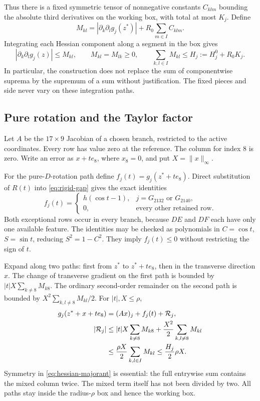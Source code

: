 \documentclass[11pt]{article}
\begin{document}
Thus there is a fixed symmetric tensor of nonnegative constants $C_{klm}$ bounding the absolute third derivatives on the working box, with total at most $K_j$. Define
\[
 M_{kl}=|\partial_k\partial_lg_j(z^*)|+R_0\sum_{m\in I}C_{klm}.
\]
Integrating each Hessian component along a segment in the box gives
\begin{equation}\label{eq:hessian-majorant}
 |\partial_k\partial_lg_j(z)|\le M_{kl},\qquad
 M_{kl}=M_{lk}\ge0,\qquad
 \sum_{k,l\in I}M_{kl}\le H_j:=H_j^0+R_0K_j.
\end{equation}
In particular, the construction does not replace the sum of componentwise suprema by the supremum of a sum without justification. The fixed pieces and side never vary on these integration paths.

\subsection{Pure rotation and the Taylor factor}

Let $A$ be the $17\times9$ Jacobian of a chosen branch, restricted to the active coordinates. Every row has value zero at the reference. The column for index $8$ is zero. Write an error as $x+t e_8$, where $x_8=0$, and put $X=\|x\|_\infty$.

For the pure-$D$-rotation path define $f_j(t)=g_j(z^*+t e_8)$. Direct substitution of $R(t)$ into \eqref{eq:rigid-gap} gives the exact identities
\begin{equation}\label{eq:pure-rotation}
 f_j(t)=\begin{cases}
 h(\cos t-1),&j=G_{2132}\text{ or }G_{2140},\\
 0,&\text{every other retained row}.
 \end{cases}
\end{equation}
Both exceptional rows occur in every branch, because $DE$ and $DF$ each have only one available feature. The identities may be checked as polynomials in $C=\cos t$, $S=\sin t$, reducing $S^2=1-C^2$. They imply $f_j(t)\le0$ without restricting the sign of $t$.

Expand along two paths: first from $z^*$ to $z^*+t e_8$, then in the transverse direction $x$. The change of transverse gradient on the first path is bounded by $|t|X\sum_{k\ne8}M_{k8}$. The ordinary second-order remainder on the second path is bounded by $X^2\sum_{k,l\ne8}M_{kl}/2$. For $|t|,X\le\rho$,
\begin{align}\label{eq:taylor}
 g_j(z^*+x+t e_8)&=(Ax)_j+f_j(t)+\mathcal R_j,\\
 |\mathcal R_j|
 &\le |t|X\sum_{k\ne8}M_{k8}
       +\frac{X^2}2\sum_{k,l\ne8}M_{kl}\notag\\
 &\le\frac{\rho X}2\sum_{k,l\in I}M_{kl}
 \le\frac{H_j}2\rho X.\notag
\end{align}
Symmetry in \eqref{eq:hessian-majorant} is essential: the full entrywise sum contains the mixed column twice. The mixed term itself has not been divided by two. All paths stay inside the radius-$\rho$ box and hence the working box.
\end{document}
